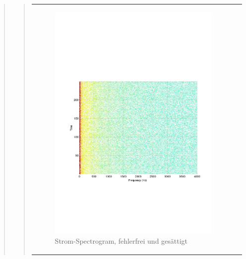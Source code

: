 \begin{quote}
\begin{quote}
\begin{center}
\begin{tabular}{ll}
\begin{minipage}{0.6\textwidth}
                    \end{minipage}
                    \begin{minipage}{0.6\textwidth}
    
                        \begin{figure}[H]
                            \label{fig:}
                            \includegraphics[scale=0.4, trim = 2cm 6cm 1cm
                            7.5cm,
                            clip]{./Bilder/Termin8/fehlerfrei_gesaettig_Spectrogam.pdf}
                            \caption{Strom-Spectrogram, fehlerfrei und
                            gesättigt}
                        \end{figure}
                    \vspace{-1.5em}
    

\end{minipage}
\end{tabular}
\end{center}
\end{quote}
\end{quote}
